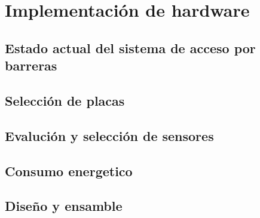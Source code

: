 \chapter{Implementación de hardware}

\section{Estado actual del sistema de acceso por barreras}

\section{Selección de placas}

\section{Evalución y selección de sensores}

\section{Consumo energetico}

\section{Diseño y ensamble}